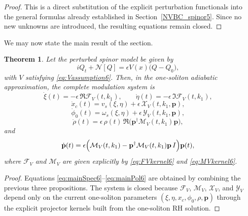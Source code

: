 \documentclass[11pt]{amsart}
\newtheorem{theorem}{Theorem}[section]
\theoremstyle{definition}
\numberwithin{equation}{section}
\begin{document}
\begin{proof}
This is a direct substitution of the explicit perturbation functionals into the general formulas already established in Section~\ref{NVBC_spinor5}. Since no new unknowns are introduced, the resulting equations remain closed.
\end{proof}

We may now state the main result of the section.

\begin{theorem}
Let the perturbed spinor model be given by
\begin{equation}
iQ_t+\mathcal N[Q]=\epsilon V(x)\bigl(Q-Q_0\bigr),
\label{eq:MainPerturbedSystem6}
\end{equation}
with \(V\) satisfying \eqref{eq:Vassumption6}. Then, in the one-soliton adiabatic approximation, the complete modulation system is
\begin{equation}
\dot{\xi}(t)
=
-\epsilon\,\Re \mathcal F_V(t,k_1),
\qquad
\dot{\eta}(t)
=
-\epsilon\,\Im \mathcal F_V(t,k_1),
\label{eq:mainSpec6}
\end{equation}
\begin{equation}
\dot{x}_c(t)
=
v_s(\xi,\eta)+\epsilon\,\mathcal X_V(t,k_1,\mathbf p),
\label{eq:mainCenter6}
\end{equation}
\begin{equation}
\dot{\phi}_0(t)
=
\omega_s(\xi,\eta)+\epsilon\,\mathcal Y_V(t,k_1,\mathbf p),
\label{eq:mainPhase6}
\end{equation}
\begin{equation}
\dot{\rho}(t)
=
\epsilon\,\rho(t)\,
\Re\bigl(\mathbf p^\dagger \mathcal M_V(t,k_1)\mathbf p\bigr),
\label{eq:mainRho6}
\end{equation}
and
\begin{equation}
\dot{\mathbf p}(t)
=
\epsilon
\Bigl(
\mathcal M_V(t,k_1)
-
\mathbf p^\dagger \mathcal M_V(t,k_1)\mathbf p\,I
\Bigr)\mathbf p(t),
\label{eq:mainPol6}
\end{equation}
where \(\mathcal F_V\) and \(\mathcal M_V\) are given explicitly by \eqref{eq:FVkernel6} and \eqref{eq:MVkernel6}.
\end{theorem}

\begin{proof}
Equations \eqref{eq:mainSpec6}--\eqref{eq:mainPol6} are obtained by combining the previous three propositions. The system is closed because \(\mathcal F_V\), \(\mathcal M_V\), \(\mathcal X_V\), and \(\mathcal Y_V\) depend only on the current one-soliton parameters \((\xi,\eta,x_c,\phi_0,\rho,\mathbf p)\) through the explicit projector kernels built from the one-soliton RH solution.
\end{proof}
\end{document}
